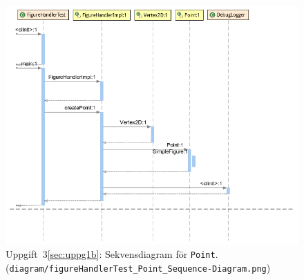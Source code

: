 \begin{figure}[ht]
\centering
\includegraphics[width=\linewidth]{diagram/figureHandlerTest_Point_Sequence-Diagram.png}
\caption{Uppgift~3\ref{sec:uppg1b}: Sekvensdiagram för \texttt{Point}.
\\ (\texttt{diagram/figureHandlerTest\_Point\_Sequence-Diagram.png})}
\label{fig:sekv-point}
\end{figure}


